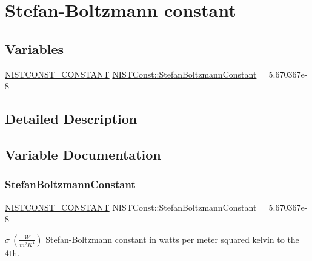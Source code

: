 \hypertarget{group___n_i_s_t_const-_stefan_boltzmann_constant}{}\section{Stefan-\/\+Boltzmann constant}
\label{group___n_i_s_t_const-_stefan_boltzmann_constant}
\subsection*{Variables}
\begin{DoxyCompactItemize}
\item 
\mbox{\hyperlink{group___n_i_s_t_const-_macros_ga2b0fc1d7452373f816175dd86ce26729}{N\+I\+S\+T\+C\+O\+N\+S\+T\+\_\+\+C\+O\+N\+S\+T\+A\+NT}} \mbox{\hyperlink{group___n_i_s_t_const-_stefan_boltzmann_constant_ga7a87fa5e9ed3db503ee24f828d1dc700}{N\+I\+S\+T\+Const\+::\+Stefan\+Boltzmann\+Constant}} = 5.\+670367e-\/8
\end{DoxyCompactItemize}


\subsection{Detailed Description}


\subsection{Variable Documentation}
\mbox{\label{group___n_i_s_t_const-_stefan_boltzmann_constant_ga7a87fa5e9ed3db503ee24f828d1dc700}} 
\subsubsection{\texorpdfstring{Stefan\+Boltzmann\+Constant}{StefanBoltzmannConstant}}
{\footnotesize\ttfamily \mbox{\hyperlink{group___n_i_s_t_const-_macros_ga2b0fc1d7452373f816175dd86ce26729}{N\+I\+S\+T\+C\+O\+N\+S\+T\+\_\+\+C\+O\+N\+S\+T\+A\+NT}} N\+I\+S\+T\+Const\+::\+Stefan\+Boltzmann\+Constant = 5.\+670367e-\/8}

$\sigma \ (\frac{W}{m^2 K^4})$ Stefan-\/\+Boltzmann constant in watts per meter squared kelvin to the 4th. 
